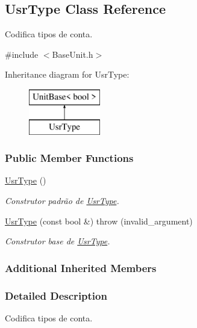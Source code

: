 \hypertarget{classUsrType}{\subsection{Usr\-Type Class Reference}
\label{d1/dd4/classUsrType}
}


Codifica tipos de conta.  




{\ttfamily \#include $<$Base\-Unit.\-h$>$}

Inheritance diagram for Usr\-Type\-:\begin{figure}[H]
\begin{center}
\leavevmode
\includegraphics[height=2.000000cm]{d1/dd4/classUsrType}
\end{center}
\end{figure}
\subsubsection*{Public Member Functions}
\begin{DoxyCompactItemize}
\item 
\hyperlink{classUsrType_a51a73c6f2cfbca3174120a2796957c03}{Usr\-Type} ()
\begin{DoxyCompactList}\small\item\em Construtor padrão de \hyperlink{classUsrType}{Usr\-Type}. \end{DoxyCompactList}\item 
\hyperlink{classUsrType_a774f3a391ac5741802862cb7de682bb9}{Usr\-Type} (const bool \&)  throw (invalid\-\_\-argument)
\begin{DoxyCompactList}\small\item\em Construtor base de \hyperlink{classUsrType}{Usr\-Type}. \end{DoxyCompactList}\end{DoxyCompactItemize}
\subsubsection*{Additional Inherited Members}


\subsubsection{Detailed Description}
Codifica tipos de conta. 

